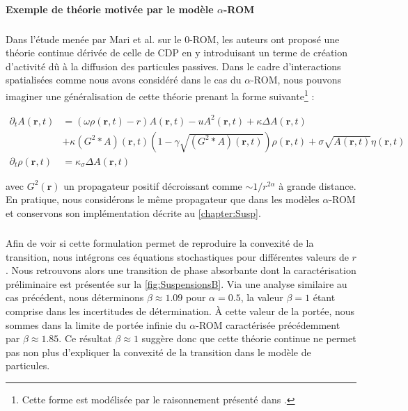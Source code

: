 \paragraph{Exemple de théorie motivée par le modèle $\alpha$-ROM}

\subparagraph{}Dans l'étude menée par Mari et al. \cite{mari_absorbing_2022} sur le $0$-ROM, les auteurs ont proposé une théorie continue dérivée de celle de CDP en y introduisant un terme de création d'activité dû à la diffusion des particules passives. Dans le cadre d'interactions spatialisées comme nous avons considéré dans le cas du $\alpha$-ROM, nous pouvons imaginer une généralisation de cette théorie prenant la forme suivante\footnote{Cette forme est modélisée par le raisonnement présenté dans \cite{mari_absorbing_2022}.} :

\begin{equation}
    \begin{aligned}
        \partial_t A (\mathbf{r}, t) &= \left(\omega \rho (\mathbf{r}, t)-r\right) A (\mathbf{r}, t) - uA^2 (\mathbf{r}, t) +\kappa \Delta A (\mathbf{r}, t)\\
        &+ \kappa \left(G^2\ast A \right)(\mathbf{r}, t)\left(1-\gamma \sqrt{ \left(G^2\ast A \right)(\mathbf{r}, t)}\right)\rho (\mathbf{r}, t)+ \sigma \sqrt{A (\mathbf{r}, t)}\eta (\mathbf{r}, t)\\
        \partial_t \rho (\mathbf{r}, t) &= \kappa_\sigma \Delta A (\mathbf{r}, t)
    \end{aligned}
\label{eq:SuspensionsB}
\end{equation}

\noindent avec $G^2(\mathbf{r})$ un propagateur positif décroissant comme $\sim 1/r^{2\alpha}$ à grande distance. En pratique, nous considérons le même propagateur que dans les modèles $\alpha$-ROM et conservons son implémentation décrite au \autoref{chapter:Susp}.

\subparagraph{}Afin de voir si cette formulation permet de reproduire la convexité de la transition, nous intégrons ces équations stochastiques pour différentes valeurs de $r$. Nous retrouvons alors une transition de phase absorbante dont la caractérisation préliminaire est présentée sur la \autoref{fig:SuspensionsB}. Via une analyse similaire au cas précédent, nous déterminons $\beta \approx 1.09$ pour $\alpha = 0.5$, la valeur $\beta = 1$ étant comprise dans les incertitudes de détermination. \`A cette valeur de la portée, nous sommes dans la limite de portée infinie du $\alpha$-ROM caractérisée précédemment par $\beta \approx 1.85$. Ce résultat $\beta \approx 1$ suggère donc que cette théorie continue ne permet pas non plus d'expliquer la convexité de la transition dans le modèle de particules.

